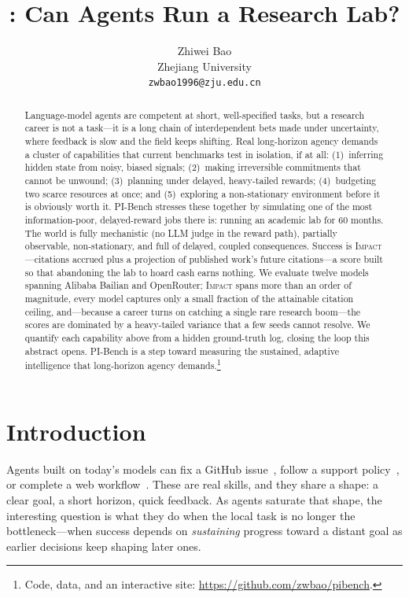\documentclass[11pt]{article}
\title{\bench: Can Agents Run a Research Lab?}
\author{Zhiwei Bao\\ Zhejiang University\\ \texttt{zwbao1996@zju.edu.cn}}
\date{}
\newcommand{\impact}{\textsc{Impact}}
\newcommand{\bench}{PI-Bench}
\begin{document}
\maketitle

\begin{abstract}
Language-model agents are competent at short, well-specified tasks, but a research career
is not a task---it is a long chain of interdependent bets made under uncertainty, where
feedback is slow and the field keeps shifting. Real long-horizon agency demands a cluster
of capabilities that current benchmarks test in isolation, if at all:
(1)~inferring hidden state from noisy, biased signals;
(2)~making irreversible commitments that cannot be unwound;
(3)~planning under delayed, heavy-tailed rewards;
(4)~budgeting two scarce resources at once; and
(5)~exploring a non-stationary environment before it is obviously worth it.
\bench{} stresses these together by simulating one of the most information-poor,
delayed-reward jobs there is: running an academic lab for 60 months. The world is fully
mechanistic (no LLM judge in the reward path), partially observable, non-stationary, and
full of delayed, coupled consequences. Success is \impact{}---citations accrued plus a
projection of published work's future citations---a score built so that abandoning the
lab to hoard cash earns nothing. We evaluate twelve models spanning Alibaba Bailian and
OpenRouter; \impact{} spans more than an order of magnitude, every model captures only a
small fraction of the attainable citation ceiling, and---because a career turns on
catching a single rare research boom---the scores are dominated by a heavy-tailed variance
that a few seeds cannot resolve. We quantify each capability above from a hidden
ground-truth log, closing the loop this abstract opens. \bench{} is a step toward measuring
the sustained, adaptive intelligence that long-horizon agency demands.\footnote{Code, data,
and an interactive site: \url{https://github.com/zwbao/pibench}.}
\end{abstract}

\section{Introduction}
Agents built on today's models can fix a GitHub issue~\citep{jimenez2024swebench}, follow a
support policy~\citep{yao2025taubench}, or complete a web workflow~\citep{zhou2024webarena}.
These are real skills, and they share a shape: a clear goal, a short horizon, quick feedback.
As agents saturate that shape, the interesting question is what they do when the local task is
no longer the bottleneck---when success depends on \emph{sustaining} progress toward a distant
goal as earlier decisions keep shaping later ones.
\end{document}
